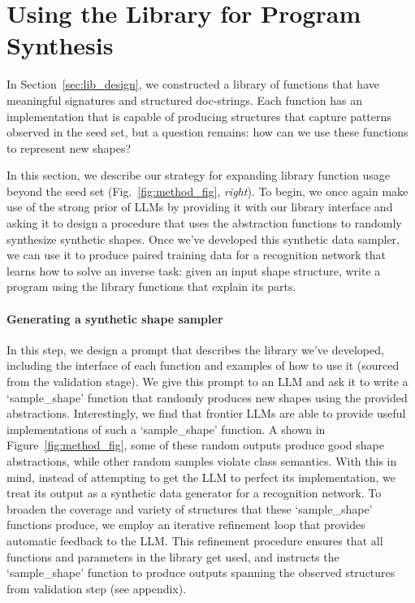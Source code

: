 

\section{Using the Library for Program Synthesis}
\label{sec:lib_usage}

In Section~\ref{sec:lib_design}, we constructed a library of functions that have meaningful signatures and structured doc-strings.
Each function has an implementation that is capable of producing structures that capture patterns observed in the seed set, but a question remains: how can we use these functions to represent new shapes?

In this section, we describe our strategy for expanding library function usage beyond the seed set (Fig.~\ref{fig:method_fig}, \textit{right}).
To begin, we once again make use of the strong prior of LLMs by providing it with our library interface and asking it to design a procedure that uses the abstraction functions to randomly synthesize synthetic shapes.
Once we've developed this synthetic data sampler, we can use it to produce paired training data for a recognition network that learns how to solve an inverse task: given an input shape structure, write a program using the library functions that explain its parts.


\paragraph{Generating a synthetic shape sampler}

In this step, we design a prompt that describes the library we've developed, including the interface of each function  and examples of how to use it (sourced from the validation stage).
We give this prompt to an LLM and ask it to write a `sample\_shape' function that randomly produces new shapes using the provided abstractions.
Interestingly, we find that frontier LLMs are able to provide useful implementations of such a `sample\_shape' function.
A shown in Figure~\ref{fig:method_fig}, some of these random outputs produce good shape abstractions, while other random samples violate class semantics.
With this in mind, instead of attempting to get the LLM to perfect its implementation, we treat its output as a synthetic data generator for a recognition network. 
To broaden the coverage and variety of structures that these `sample\_shape' functions produce, we employ an iterative refinement loop that provides automatic feedback to the LLM.
This refinement procedure ensures that all functions and parameters in the library get used, and instructs the `sample\_shape' function to produce outputs spanning the observed structures from validation step (see appendix).


